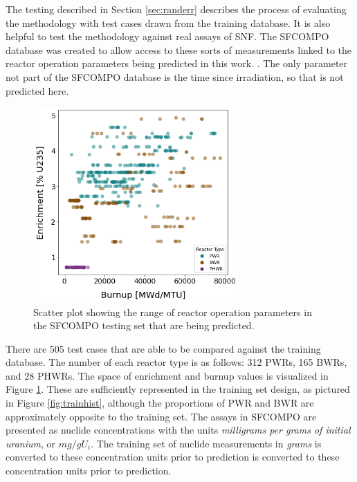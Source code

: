 
The testing described in Section \ref{sec:randerr} describes the process of
evaluating the methodology with test cases drawn from the training database.
It is also helpful to test the methodology against real assays of \gls{SNF}.
The \gls{SFCOMPO} database was created to allow access to these sorts of
measurements linked to the reactor operation parameters being predicted in this
work. \cite{sfcompo}. The only parameter not part of the \gls{SFCOMPO} database
is the time since irradiation, so that is not predicted here. 

\begin{figure}[!htb]
  \centering
  \includegraphics[width=0.7\textwidth]{./chapters/exp1/sfcompo_scatter_viz.png}
  \caption{Scatter plot showing the range of reactor operation parameters in 
           the \gls{SFCOMPO} testing set that are being predicted.}
  \label{fig:sfcoscatter}
\end{figure}

There are 505 test cases that are able to be compared against the training
database.  The number of each reactor type is as follows: 312 \gls{PWR}s, 165
\gls{BWR}s, and 28 \gls{PHWR}s. The space of enrichment and burnup values is
visualized in Figure \ref{fig:sfcoscatter}. These are sufficiently represented
in the training set design, as pictured in Figure \ref{fig:trainhist}, although
the proportions of \gls{PWR} and \gls{BWR} are approximately opposite to the
training set. The assays in \gls{SFCOMPO} are presented as nuclide
concentrations with the units \textit{milligrams per grams of initial uranium},
or $mg/gU_i$. The training set of nuclide measurements in \textit{grams} is
converted to these concentration units prior to prediction is converted to
these concentration units prior to prediction. 


